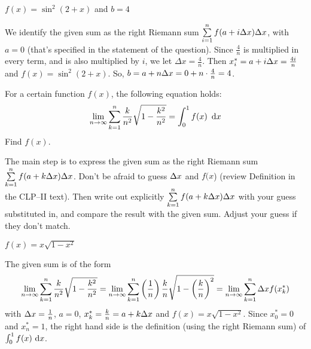 \begin{answer}
$f(x) = \sin^2 (2 + x)$ and $b=4$
\end{answer}

\begin{solution}
We identify the given sum as the right Riemann sum
$\sum\limits_{i=1}^{n} f(a+i\Delta x)\Delta  x$,
with $a=0$ (that's specified in the statement of the question). Since $\frac{4}{n}$ is multiplied in every term, and is also multiplied by $i$, we let
 $\Delta x = \frac{4}{n}$. Then $x_i^* = a+i\Delta x=\frac{4i}{n}$
and $f(x) = \sin^2 (2 + x)$. So, $b=a+n\Delta x=0+n\cdot\frac{4}{n}=4$.
\end{solution}

\begin{Mquestion}[M105 2102A]
For a certain function $f(x)$, the following equation holds:
\begin{equation*}
\lim_{n\rightarrow\infty}\sum\limits_{k=1}^n
\frac{k}{n^2}\sqrt{1-\frac{k^2}{n^2}}
=\int_0^1 f(x)\ \,\mathrm{d}x
\end{equation*}
Find $f(x)$.
\end{Mquestion}

\begin{hint}
The main step is to express the given sum as the right Riemann sum
$\sum\limits_{k=1}^{n} f(a+k\Delta x)\Delta  x$.
Don't be afraid to guess $\Delta x$ and $f(x$)
(review Definition   in the
CLP--II text).
Then write out explicitly $ \sum\limits_{k=1}^{n} f(a+k\Delta x)\Delta  x$
with your guess substituted in, and compare the result with the given sum.  Adjust your guess if they don't match.
\end{hint}

\begin{answer}
$f(x)=x\sqrt{1-x^2}$
\end{answer}

\begin{solution}
The given sum is of the form
\begin{align*}
\lim_{n\rightarrow\infty}\sum_{k=1}^n
             \frac{k}{n^2}\sqrt{1-\frac{k^2}{n^2}}
=\lim_{n\rightarrow\infty}\sum_{k=1}^n
            \left(\frac{1}{n}\right) \frac{k}{n}\sqrt{1-\left(\frac{k}{n}\right)^2}
=\lim_{n\rightarrow\infty}\sum_{k=1}^n \Delta x f(x_k^*)
\end{align*}
with $\Delta x=\frac{1}{n}$, $a=0$, $x_k^*=\frac{k}{n}=a+k\Delta x$
and $f(x)=x\sqrt{1-x^2}$.
Since $x_0^*=0$ and $x_n^*=1$, the right hand side is the definition
(using the right Riemann sum) of
$
\int_0^1 f(x)\,\,\mathrm{d}x
$.

\end{solution}


